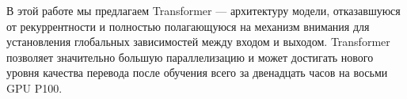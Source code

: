 \documentclass{article}
\begin{document}
В этой работе мы предлагаем Transformer — архитектуру модели, отказавшуюся от рекуррентности и полностью полагающуюся на механизм внимания для установления глобальных зависимостей между входом и выходом. Transformer позволяет значительно большую параллелизацию и может достигать нового уровня качества перевода после обучения всего за двенадцать часов на восьми GPU P100. 

\end{document}
